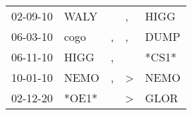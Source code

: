 \begin{supertabular}{p{0.07\textwidth}p{0.06\textwidth}p{0.02\textwidth}p{0.02\textwidth}p{0.06\textwidth}}
 02-09-10\textsuperscript{} &  WALY\textsuperscript{} &    &             , &  HIGG\textsuperscript{} \\
 06-03-10\textsuperscript{} &  cogo\textsuperscript{} &  , &             , &  DUMP\textsuperscript{} \\
 06-11-10\textsuperscript{} &  HIGG\textsuperscript{} &  , &               &                   *CS1* \\
 10-01-10\textsuperscript{} &  NEMO\textsuperscript{} &  , &  \textgreater &  NEMO\textsuperscript{} \\
 02-12-20\textsuperscript{} &                   *OE1* &    &  \textgreater &  GLOR\textsuperscript{} \\
\end{supertabular}
